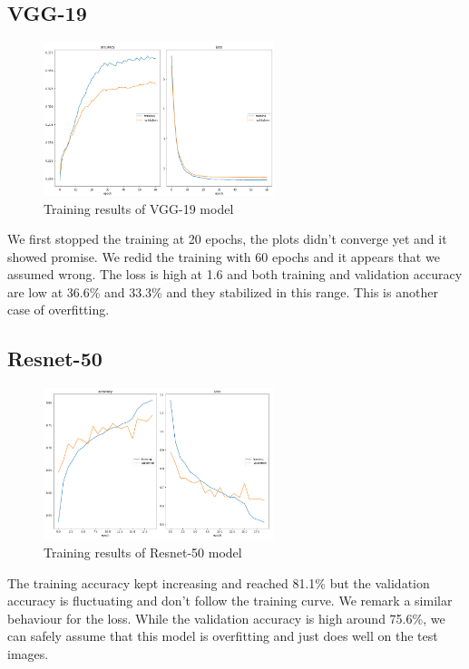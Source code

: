 \documentclass[12pt,a4paper,oneside,english]{book}
\begin{document}
\subsection{VGG-19}
\begin{figure}[H]
    \centering
    \includegraphics[width=0.6\textwidth]{figures/model/vgggraph.jpg}
    \caption{Training results of VGG-19 model}
    \label{fig:vgggraph}
\end{figure}
\noindent
We first stopped the training at 20 epochs, the plots didn't converge yet and it showed promise. We redid the training with 60 epochs and it appears that we assumed wrong. The loss is high at 1.6 and both training and validation accuracy are low at 36.6\% and 33.3\% and they stabilized in this range. This is another case of overfitting.
\subsection{Resnet-50}
\begin{figure}[H]
    \centering
    \includegraphics[width=0.6\textwidth]{figures/model/resnetgraph.jpg}
    \caption{Training results of Resnet-50 model}
    \label{fig:resnetgraph}
\end{figure}
\noindent
The training accuracy kept increasing and reached 81.1\% but the validation accuracy is fluctuating and don't follow the training curve. We remark a similar behaviour for the loss. While the validation accuracy is high around 75.6\%, we can safely assume that this model is overfitting and just does well on the test images.
\end{document}
